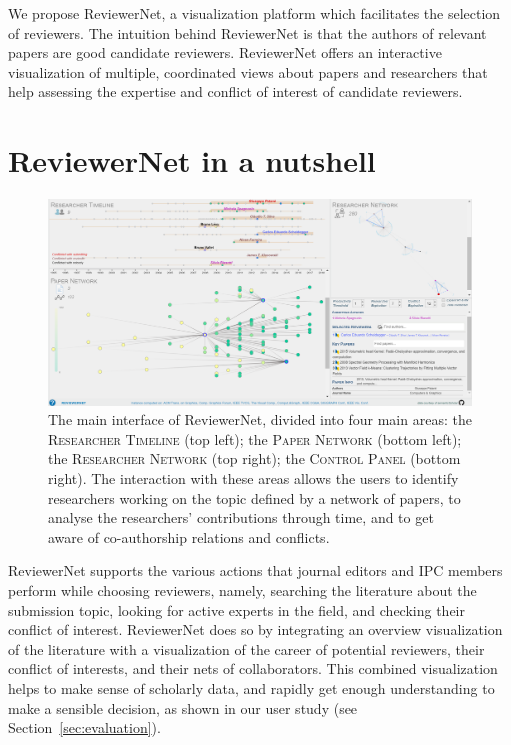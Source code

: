 We propose ReviewerNet, a visualization platform which facilitates the selection of reviewers. The intuition behind ReviewerNet is that the authors of relevant papers are good candidate reviewers. ReviewerNet offers an interactive visualization of multiple, coordinated views about papers and researchers that help assessing the expertise and conflict of interest of candidate reviewers.

\section{ReviewerNet in a nutshell}

\begin{figure}[t]
\centering
\includegraphics[width=\textwidth]{images/screenshot2.png}
\caption{The main interface of ReviewerNet, divided into four main areas: the \textsc{Researcher Timeline } (top left); the \textsc{Paper Network }(bottom left); the \textsc{Researcher Network } (top right); the \textsc{Control Panel } (bottom right). The interaction with these areas allows the users to identify researchers working on the topic defined by a network of papers, to analyse the researchers' contributions through time, and to get aware of co-authorship relations and conflicts.}
\label{fig:interface}
\end{figure}

ReviewerNet supports the various actions that journal editors and IPC members perform while choosing reviewers, namely, searching the literature about the submission topic, looking for active experts in the field, and checking their conflict of interest. ReviewerNet does so by integrating an overview visualization of the literature with a visualization of the career of potential reviewers, their conflict of interests, and their nets of collaborators. This combined visualization helps to make sense of scholarly data, and rapidly get enough understanding to make a sensible decision, as shown in our user study (see Section~\ref{sec:evaluation}). 

